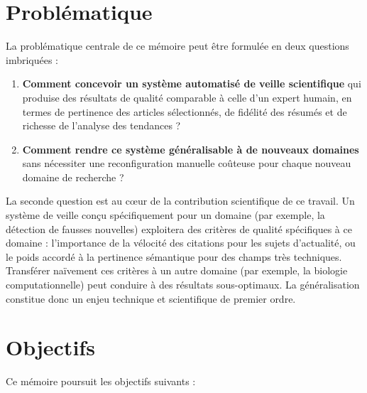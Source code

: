 \section{Problématique}

La problématique centrale de ce mémoire peut être formulée en deux questions
imbriquées :

\begin{enumerate}
  \item \textbf{Comment concevoir un système automatisé de veille scientifique}
    qui produise des résultats de qualité comparable à celle d'un expert humain,
    en termes de pertinence des articles sélectionnés, de fidélité des résumés
    et de richesse de l'analyse des tendances ?
  \item \textbf{Comment rendre ce système généralisable à de nouveaux domaines}
    sans nécessiter une reconfiguration manuelle coûteuse pour chaque nouveau
    domaine de recherche ?
\end{enumerate}

La seconde question est au cœur de la contribution scientifique de ce travail.
Un système de veille conçu spécifiquement pour un domaine (par exemple, la
détection de fausses nouvelles) exploitera des critères de qualité spécifiques
à ce domaine : l'importance de la vélocité des citations pour les sujets
d'actualité, ou le poids accordé à la pertinence sémantique pour des champs
très techniques. Transférer naïvement ces critères à un autre domaine (par
exemple, la biologie computationnelle) peut conduire à des résultats
sous-optimaux. La généralisation constitue donc un enjeu technique et
scientifique de premier ordre.

\section{Objectifs}

Ce mémoire poursuit les objectifs suivants :

